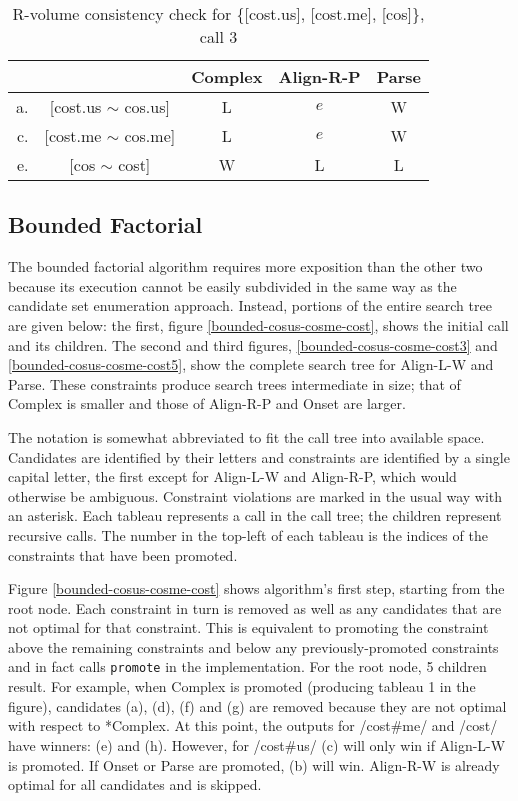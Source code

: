 \documentclass[11pt]{article}
\begin{document}
\begin{table}
\begin{tabular}{|rc||c|c|c|}\hline
 && {\sc *Complex} & {\sc Align-R-P} & {\sc Parse} \\ \hline\hline
 a. & [cost.us $\sim$ cos.us] & L &$e$  & W\\ \hline
 c. & [cost.me $\sim$ cos.me] &L & $e$& W\\ \hline
 e. & [cos $\sim$ cost]         & W & L    & L \\ \hline
\end{tabular}
  \caption{R-volume consistency check for \{[cost.us], [cost.me],
    [cos]\}, call 3}
  \label{r-volume-costus-costme-cos3}
\end{table}

\subsection{Bounded Factorial}

The bounded factorial algorithm requires more exposition than the
other two because its execution cannot be easily subdivided in the
same way as the candidate set enumeration approach.
Instead, portions of the entire search tree are
given below: the first, figure \ref{bounded-cosus-cosme-cost}, shows
the initial call and its children. The second and third figures,
\ref{bounded-cosus-cosme-cost3} and \ref{bounded-cosus-cosme-cost5},
show the complete search tree for {\sc Align-L-W} and {\sc
  Parse}. These constraints produce search trees intermediate in size;
that of {\sc *Complex} is smaller and those of {\sc Align-R-P} and
{\sc Onset} are larger.

The notation is somewhat abbreviated to fit the call tree into
available space. Candidates are identified by their letters and
constraints are identified by a single capital letter, the first
except for {\sc Align-L-W} and {\sc Align-R-P}, which would otherwise
be ambiguous. Constraint violations are marked in the usual way with
an asterisk. Each tableau represents a call in the call tree;
the children represent recursive calls. The number in the top-left of
each tableau is the indices of the constraints that have been promoted.

Figure \ref{bounded-cosus-cosme-cost} shows algorithm's first step,
starting from the root node. Each constraint in turn is removed as
well as any candidates that are not optimal for that constraint. This
is equivalent to promoting the constraint above the remaining
constraints and below any previously-promoted constraints and in fact
calls {\tt promote} in the implementation. For the root node, 5
children result. For example, when {\sc *Complex} is promoted
(producing tableau 1 in the figure), candidates (a), (d), (f) and (g)
are removed because they are not optimal with respect to {\sc
  *Complex}. At this point, the outputs for /cost\#me/ and /cost/ have
winners: (e) and (h).  However, for /cost\#us/ (c) will only win if
{\sc Align-L-W} is promoted. If {\sc Onset} or {\sc Parse} are
promoted, (b) will win. {\sc Align-R-W} is already optimal for all
candidates and is skipped.
\end{document}
